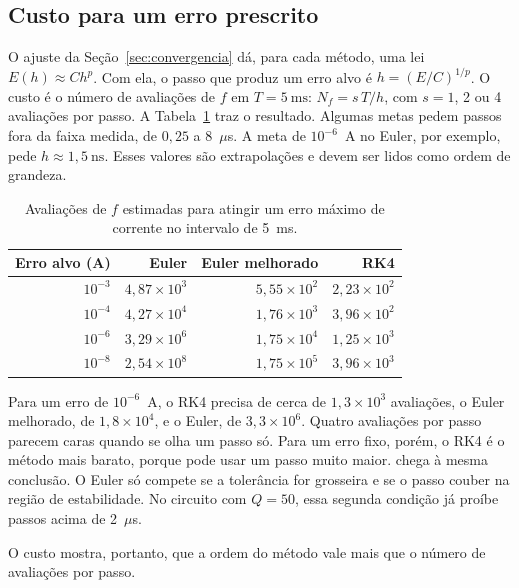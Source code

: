 \subsection{Custo para um erro prescrito}

O ajuste da Seção~\ref{sec:convergencia} dá, para cada método, uma lei \(E(h)\approx C h^{p}\). Com ela, o passo que produz um erro alvo é \(h=(E/C)^{1/p}\). O custo é o número de avaliações de \(f\) em \(T=5~\mathrm{ms}\): \(N_f=s\,T/h\), com \(s=1\), 2 ou 4 avaliações por passo. A Tabela~\ref{tab:custo} traz o resultado. Algumas metas pedem passos fora da faixa medida, de \(0{,}25\) a 8~\(\mu\)s. A meta de \(10^{-6}\)~A no Euler, por exemplo, pede \(h\approx 1{,}5~\mathrm{ns}\). Esses valores são extrapolações e devem ser lidos como ordem de grandeza.

\begin{table}[htbp]
\centering
\caption{Avaliações de \(f\) estimadas para atingir um erro máximo de corrente no intervalo de 5~ms.}
\label{tab:custo}
\small
\begin{tabular}{@{}rrrr@{}}
\toprule
Erro alvo (A) & Euler & Euler melhorado & RK4 \\
\midrule
\(10^{-3}\) & \(4{,}87\times 10^{3}\) & \(5{,}55\times 10^{2}\) & \(2{,}23\times 10^{2}\) \\
\(10^{-4}\) & \(4{,}27\times 10^{4}\) & \(1{,}76\times 10^{3}\) & \(3{,}96\times 10^{2}\) \\
\(10^{-6}\) & \(3{,}29\times 10^{6}\) & \(1{,}75\times 10^{4}\) & \(1{,}25\times 10^{3}\) \\
\(10^{-8}\) & \(2{,}54\times 10^{8}\) & \(1{,}75\times 10^{5}\) & \(3{,}96\times 10^{3}\) \\
\bottomrule
\end{tabular}
\end{table}

Para um erro de \(10^{-6}\)~A, o RK4 precisa de cerca de \(1{,}3\times 10^{3}\) avaliações, o Euler melhorado, de \(1{,}8\times 10^{4}\), e o Euler, de \(3{,}3\times 10^{6}\). Quatro avaliações por passo parecem caras quando se olha um passo só. Para um erro fixo, porém, o RK4 é o método mais barato, porque pode usar um passo muito maior. \textcite[seção~10.6]{aquino2020} chega à mesma conclusão. O Euler só compete se a tolerância for grosseira e se o passo couber na região de estabilidade. No circuito com \(Q=50\), essa segunda condição já proíbe passos acima de 2~\(\mu\)s.

O custo mostra, portanto, que a ordem do método vale mais que o número de avaliações por passo.

